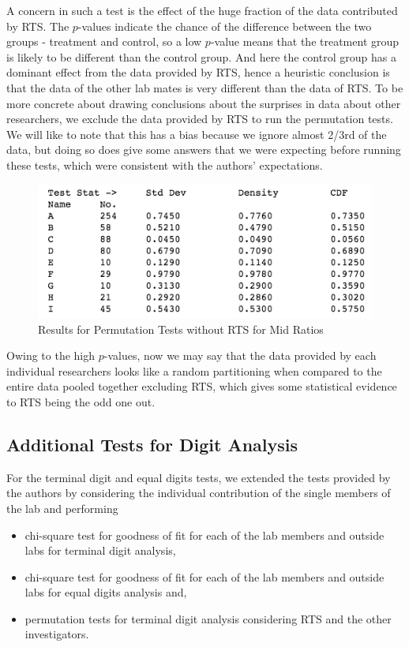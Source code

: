 \documentclass{article}
\begin{document}
A concern in such a test is the effect of the huge fraction of the data
contributed by RTS. The $p$-values indicate the chance of the difference
between the two groups - treatment and control, so a low $p$-value means
that the treatment group is likely to be different than the control
group. And here the control group has a dominant effect from the data
provided by RTS, hence a heuristic conclusion is that the data of the
other lab mates is very different than the data of RTS. To be more
concrete about drawing conclusions about the surprises in data about
other researchers, we exclude the data provided by RTS to run the
permutation tests. We will like to note that this has a bias because we
ignore almost 2/3rd of the data, but doing so does give some answers
that we were expecting before running these tests, which were consistent with the authors' expectations.

\begin{figure}[htbp]
\centering
\includegraphics[width=0.8\linewidth]{images/mid_ratio_perm_no_rts.png}
\caption{Results for Permutation Tests without RTS  for Mid Ratios}
\end{figure}

Owing to the high $p$-values, now we may say that the data provided by each individual researchers looks like a
random partitioning when compared to the entire data pooled together
excluding RTS, which gives some statistical evidence to RTS being the
odd one out.

    \subsection{Additional Tests for Digit
Analysis}\label{additional-tests-for-digit-analysis}

For the terminal digit and equal digits tests, we extended the tests provided by
the authors by considering the individual contribution of the single
members of the lab and performing
\begin{itemize}
    \item chi-square test for goodness of fit
for each of the lab members and outside labs for terminal digit analysis,
    \item chi-square test for goodness of fit for each of the lab
members and outside labs for equal digits analysis and,
    \item permutation tests for terminal digit analysis considering RTS and the other investigators.
 \end{itemize}
\end{document}
